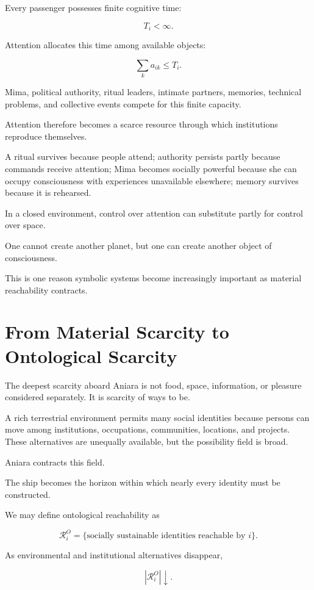 \documentclass[11pt,oneside]{book}
\theoremstyle{definition}
\theoremstyle{remark}
\newcommand{\R}{\mathcal{R}}
\begin{document}
Every passenger possesses finite cognitive time:

\[
T_i<\infty.
\]

Attention allocates this time among available objects:

\[
\sum_k a_{ik}
\leq
T_i.
\]

Mima, political authority, ritual leaders, intimate partners, memories, technical problems, and collective events compete for this finite capacity.

Attention therefore becomes a scarce resource through which institutions reproduce themselves.

A ritual survives because people attend; authority persists partly because commands receive attention; Mima becomes socially powerful because she can occupy consciousness with experiences unavailable elsewhere; memory survives because it is rehearsed.

In a closed environment, control over attention can substitute partly for control over space.

One cannot create another planet, but one can create another object of consciousness.

This is one reason symbolic systems become increasingly important as material reachability contracts.

\section{From Material Scarcity to Ontological Scarcity}

The deepest scarcity aboard Aniara is not food, space, information, or pleasure considered separately. It is scarcity of ways to be.

A rich terrestrial environment permits many social identities because persons can move among institutions, occupations, communities, locations, and projects. These alternatives are unequally available, but the possibility field is broad.

Aniara contracts this field.

The ship becomes the horizon within which nearly every identity must be constructed.

We may define ontological reachability as

\[
\R_i^{O}
=
\{
\text{socially sustainable identities reachable by }i
\}.
\]

As environmental and institutional alternatives disappear,

\[
|\R_i^{O}|\downarrow.
\]
\end{document}
